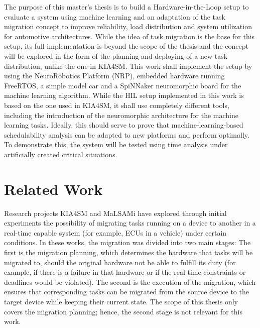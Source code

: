The purpose of this master’s thesis is to build a Hardware-in-the-Loop setup to evaluate a system using machine learning and an adaptation of the task migration concept to improve reliability, load distribution and system utilization for automotive architectures. While the idea of task migration is the base for this setup, its full implementation is beyond the scope of the thesis and the concept will be explored in the form of the planning and deploying of a new task distribution, unlike the one in KIA4SM. This work shall implement the setup by using the NeuroRobotics Platform (NRP), embedded hardware running FreeRTOS, a simple model car and a SpiNNaker neuromorphic board for the machine learning algorithm. While the HIL setup implemented in this work is based on the one used in KIA4SM, it shall use completely different tools, including the introduction of the neuromorphic architecture for the machine learning tasks. Ideally, this should serve to prove that machine-learning-based schedulability analysis can be adapted to new platforms and perform optimally. To demonstrate this, the system will be tested using time analysis under artificially created critical situations.

\chapter{Related Work}\label{chapter:relatedwork}
Research projects KIA4SM and MaLSAMi have explored through initial experiments the possibility of migrating tasks running on a device to another in a real-time capable system (for example, ECUs in a vehicle) under certain conditions. In these works, the migration was divided into two main stages: The first is the migration planning, which determines the hardware that tasks will be migrated to, should the original hardware not be able to fulfill its duty (for example, if there is a failure in that hardware or if the real-time constraints or deadlines would be violated). The second is the execution of the migration, which ensures that corresponding tasks can be migrated from the source device to the target device while keeping their current state. The scope of this thesis only covers the migration planning; hence, the second stage is not relevant for this work.


